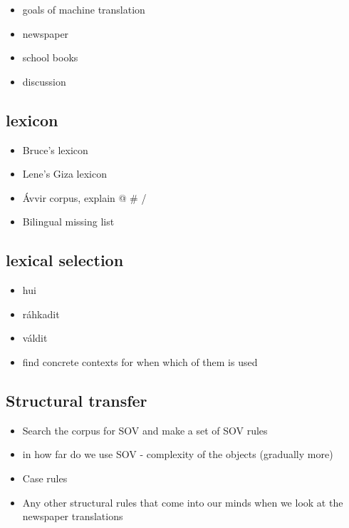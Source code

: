 \documentclass[a4paper,english,12pt]{article}
\begin{document}
\begin{itemize}
\item goals of machine translation
\item newspaper 
\item school books
\item discussion
\end{itemize}

\subsection{lexicon}
\begin{itemize}
\item Bruce's lexicon
\item Lene's Giza lexicon
\item Ávvir corpus, explain @ # /
\item Bilingual missing list
\end{itemize}

\subsection{lexical selection}
\begin{itemize}
\item hui
\item ráhkadit
\item váldit
\item find concrete contexts for when which of them is used
\end{itemize}

\subsection{Structural transfer} 

\begin{itemize}
\item Search the corpus for SOV and make a set of SOV rules
\item in how far do we use SOV - complexity of the objects (gradually more)
\item Case rules
\item Any other structural rules that come into our minds when we look at the newspaper translations
\end{itemize}
\end{document}
